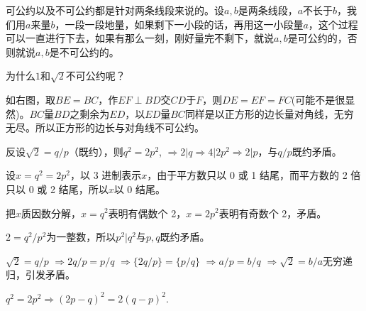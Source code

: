 \documentclass{article}
\theoremstyle{nonumberplain}\theorembodyfont{\normalfont}\theoremsymbol{$\Box$}
\begin{document}
可公约以及不可公约都是针对两条线段来说的。设$a,b$是两条线段，$a$不长于$b$，我们用$a$来量$b$，一段一段地量，如果剩下一小段的话，再用这一小段量$a$，这个过程可以一直进行下去，如果有那么一刻，刚好量完不剩下，就说$a,b$是可公约的，否则就说$a,b$是不可公约的。
\par 为什么$1$和$\sqrt2$不可公约呢？
\par
\begin{minipage}{\textwidth}\begin{minipage}{0.6\textwidth}
如右图，取$BE=BC$，作$EF\perp BD$交$CD$于$F$，则$DE=EF=FC$(可能不是很显然)。$BC$量$BD$之剩余为$ED$，以$ED$量$BC$同样是以正方形的边长量对角线，无穷无尽。所以正方形的边长与对角线不可公约。
\end{minipage}\quad\begin{minipage}{0.4\textwidth}
\end{minipage}\end{minipage}

\newcommand\proof[1]{\par\vspace*{1em}{\large\bf#1}\par}
\proof{证明$\mathbf{\sqrt2}$是无理数之整除}
反设$\sqrt2=q/p$（既约），则$q^2=2p^2$, $\Rightarrow 2|q \Rightarrow 4|2p^2 \Rightarrow 2|p$，与$q/p$既约矛盾。

\proof{3 进制表示}
设$x=q^2=2p^2$，以 3 进制表示$x$，由于平方数只以 0 或 1 结尾，而平方数的 2 倍只以 0 或 2 结尾，所以$x$以 0 结尾。

\proof{算术基本定理}
把$x$质因数分解，$x=q^2$表明有偶数个 2，$x=2p^2$表明有奇数个 2，矛盾。

\proof{平方为整数}
$2=q^2/p^2$为一整数，所以$p^2|q^2$与$p,q$既约矛盾。

\proof{取出小数部分}
$\sqrt2=q/p$ $\Rightarrow 2q/p=p/q$ $\Rightarrow \{2q/p\}=\{p/q\}$ $\Rightarrow a/p=b/q$ $\Rightarrow \sqrt2=b/a$无穷递归，引发矛盾。

\proof{又一个无穷递归}
$q^2=2p^2 \Rightarrow (2p-q)^2=2(q-p)^2$.
\end{document}
